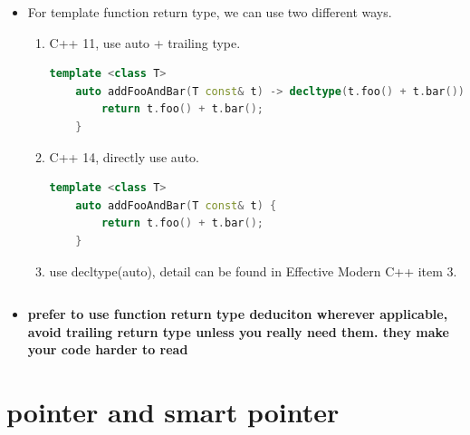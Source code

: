 \documentclass[a4paper,12pt,twoside]{book}
\begin{document}
\begin{itemize}
\item For template function return type, we can use two different ways.
\begin{enumerate}
	\item C++ 11, use auto + trailing type.
		\begin{lstlisting}[frame=single, language=c++]
	template <class T>
	auto addFooAndBar(T const& t) -> decltype(t.foo() + t.bar()) {
		return t.foo() + t.bar();
	}
		\end{lstlisting}
	\item C++ 14, directly use auto.
	\begin{lstlisting}[frame=single, language=c++]
	template <class T>
	auto addFooAndBar(T const& t) {
		return t.foo() + t.bar();
	}
	\end{lstlisting}
	\item use decltype(auto), detail can be found in Effective Modern C++ item 3.
	\begin{lstlisting}[frame=single, language=c++]

	\end{lstlisting}
\end{enumerate}
	
	\item \textbf{prefer to use function return type deduciton wherever applicable, avoid trailing return type unless you really need them. they make your code harder to read}
\end{itemize}


\section{pointer and smart pointer}
\end{document}
